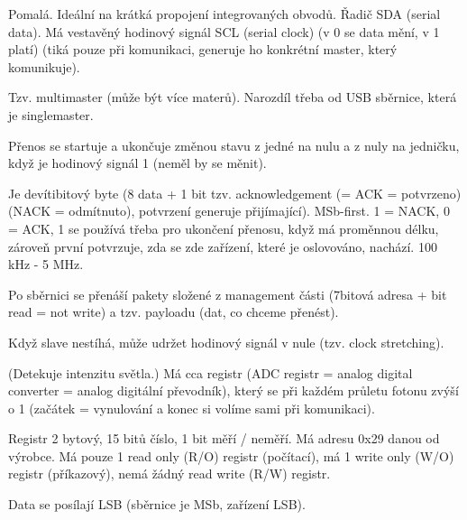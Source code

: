 \documentclass[12pt]{article}					%
\begin{document}
        \begin{definice}[$I^2 C$ = Inter Integrated Circuit]
            Pomalá. Ideální na krátká propojení integrovaných obvodů. Řadič SDA (serial data). Má vestavěný hodinový signál SCL (serial clock) (v 0 se data mění, v 1 platí) (tiká pouze při komunikaci, generuje ho konkrétní master, který komunikuje).

            Tzv. multimaster (může být více materů). Narozdíl třeba od USB sběrnice, která je singlemaster.

            Přenos se startuje a ukončuje změnou stavu z jedné na nulu a z nuly na jedničku, když je hodinový signál 1 (neměl by se měnit).

            Je devítibitový byte (8 data + 1 bit tzv. acknowledgement (= ACK = potvrzeno) (NACK = odmítnuto), potvrzení generuje přijímající). MSb-first. 1 = NACK, 0 = ACK, 1 se používá třeba pro ukončení přenosu, když má proměnnou délku, zároveň první potvrzuje, zda se zde zařízení, které je oslovováno, nachází. 100 kHz - 5 MHz.

            Po sběrnici se přenáší pakety složené z management části (7bitová adresa + bit read = not write) a tzv. payloadu (dat, co chceme přenést).

            Když slave nestíhá, může udržet hodinový signál v nule (tzv. clock stretching).
        \end{definice}

        \begin{priklady}[ALS = Ambient Light Sensor (konkrétní od everlight)]
            (Detekuje intenzitu světla.) Má cca registr (ADC registr = analog digital converter = analog digitální převodník), který se při každém průletu fotonu zvýší o 1 (začátek = vynulování a konec si volíme sami při komunikaci).

            Registr 2 bytový, 15 bitů číslo, 1 bit měří / neměří. Má adresu 0x29 danou od výrobce. Má pouze 1 read only (R/O) registr (počítací), má 1 write only (W/O) registr (příkazový), nemá žádný read write (R/W) registr.

            Data se posílají LSB (sběrnice je MSb, zařízení LSB).
        \end{priklady}
\end{document}
